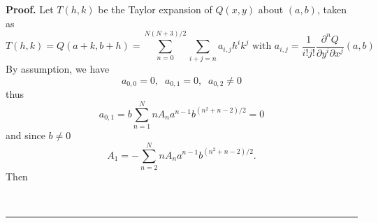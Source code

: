 \documentclass{article}
\newenvironment{proof}[1][Proof]{\textbf{#1.} }{\ \rule{0.5em}{0.5em}}
\begin{document}
\begin{proof}
\bigskip Let $T\left( h,k\right) $ be the Taylor expansion of $Q\left(
x,y\right) $ about $\left( a,b\right) $, taken as 
\begin{equation*}
T\left( h,k\right) =Q\left( a+k,b+h\right) =\sum_{n=0}^{N\left( N+3\right)
/2}\sum_{i+j=n}a_{i,j}h^{i}k^{j}\text{ with }a_{i,j}=\dfrac{1}{i!j!}\dfrac{\partial ^{n}Q}{\partial y^{i}\partial x^{j}}\left( a,b\right) 
\end{equation*}
By assumption, we have 
\begin{equation*}
a_{0,0}=0,\;\;a_{0,1}=0,\;\;a_{0,2}\neq 0
\end{equation*}
thus 
\begin{equation*}
a_{0,1}=b\sum_{n=1}^{N}nA_{n}a^{n-1}b^{\left( n^{2}+n-2\right) /2}=0
\end{equation*}
and since $b\neq 0$\begin{equation}
A_{1}=-\sum_{n=2}^{N}nA_{n}a^{n-1}b^{\left( n^{2}+n-2\right) /2}\text{.}
\end{equation}
Then


\end{proof}
\end{document}
